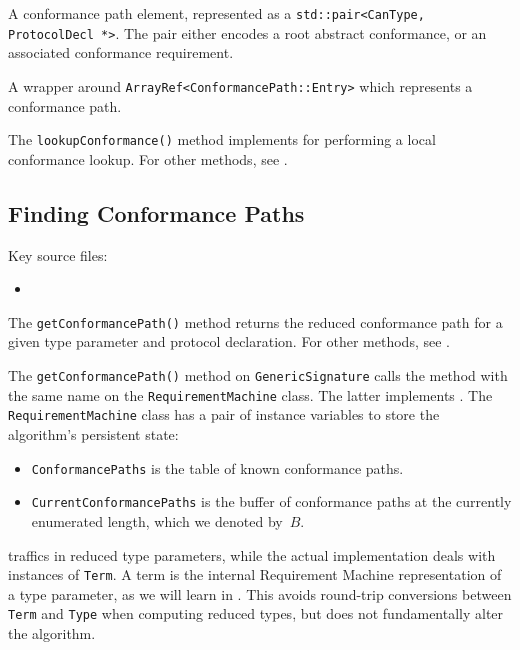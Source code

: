 \documentclass[../generics]{subfiles}
\begin{document}
A conformance path element, represented as a \verb|std::pair<CanType, ProtocolDecl *>|. The pair either encodes a root abstract conformance, or an associated conformance requirement.

A wrapper around \verb|ArrayRef<ConformancePath::Entry>| which represents a conformance path.

The \verb|lookupConformance()| method implements  for performing a local conformance lookup. For other methods, see .

\subsection*{Finding Conformance Paths}

Key source files:
\begin{itemize}
\item {}
\end{itemize}

The \texttt{getConformancePath()} method returns the reduced conformance path for a given type parameter and protocol declaration. For other methods, see .

The \texttt{getConformancePath()} method on \texttt{GenericSignature} calls the method with the same name on the \texttt{RequirementMachine} class. The latter implements . The \texttt{RequirementMachine} class has a pair of instance variables to store the algorithm's persistent state:
\begin{itemize}
\item \texttt{ConformancePaths} is the table of known conformance paths.
\item \texttt{CurrentConformancePaths} is the buffer of conformance paths at the currently enumerated length, which we denoted by~$B$.
\end{itemize}
 traffics in reduced type parameters, while the actual implementation deals with instances of \verb|Term|. A term is the internal Requirement Machine representation of a type parameter, as we will learn in . This avoids round-trip conversions between \verb|Term| and \verb|Type| when computing reduced types, but does not fundamentally alter the algorithm.
\end{document}
